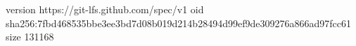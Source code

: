 version https://git-lfs.github.com/spec/v1
oid sha256:7fbd468535bbe3ee3bd7d08b019d214b28494d99ef9de309276a866ad97fcc61
size 131168
